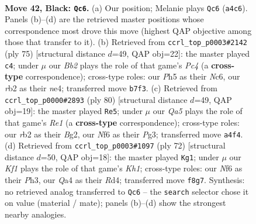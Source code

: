 \documentclass[11pt]{article}
\begin{document}
\clearpage

\begin{figure}[p]\centering
\begin{subfigure}{0.46\textwidth}\centering
\resizebox{\linewidth}{!}{%
\newchessgame
\chessboard[
  setfen={5k2/1b3p2/5np1/7p/q7/6P1/1R2RP1P/5NK1 b - - 0 42},
  showmover=false,
  pgfstyle=straightmove, color=movearrow, markmove={a4-c6}
]}
\caption{}
\end{subfigure}\hfill
\begin{subfigure}{0.46\textwidth}\centering
\resizebox{\linewidth}{!}{%
\newchessgame
\chessboard[
  setfen={6k1/1p4pp/p1n5/2p5/4NP2/1P2R1PP/5K2/1r6 b - - 3 38},
  showmover=false,
  pgfstyle=straightmove, color=movearrow, markmove={c5-c4}
]}
\caption{}
\end{subfigure}
\\[4pt]
\begin{subfigure}{0.46\textwidth}\centering
\resizebox{\linewidth}{!}{%
\newchessgame
\chessboard[
  setfen={6k1/5p1p/5rp1/2np4/p4P1P/P5P1/6BK/4R3 w - - 0 41},
  showmover=false,
  pgfstyle=straightmove, color=movearrow, markmove={e1-e5}
]}
\caption{}
\end{subfigure}\hfill
\begin{subfigure}{0.46\textwidth}\centering
\resizebox{\linewidth}{!}{%
\newchessgame
\chessboard[
  setfen={8/5pk1/5rpp/1p6/3R1P2/1P5P/6P1/7K w - - 3 37},
  showmover=false,
  pgfstyle=straightmove, color=movearrow, markmove={h1-g1}
]}
\caption{}
\end{subfigure}
\caption{\textbf{Move 42, Black: \texttt{Qc6}.} (a) Our position; Melanie plays \texttt{Qc6} (\texttt{a4c6}). Panels (b)--(d) are the retrieved master positions whose correspondence most drove this move (highest QAP objective among those that transfer to it). (b) Retrieved from \texttt{ccrl\_top\_p0003\#2142} (ply 75) [structural distance $d$=49, QAP obj=22]: the master played \texttt{c4}; under $\mu$ our \emph{Bb2} plays the role of that game's \emph{Pc4} (a \textbf{cross-type} correspondence); cross-type roles: our \emph{P}h5 as their \emph{N}c6, our \emph{r}b2 as their \emph{n}e4; transferred move \texttt{b7f3}. (c) Retrieved from \texttt{ccrl\_top\_p0000\#2893} (ply 80) [structural distance $d$=49, QAP obj=19]: the master played \texttt{Re5}; under $\mu$ our \emph{Qa5} plays the role of that game's \emph{Re1} (a \textbf{cross-type} correspondence); cross-type roles: our \emph{r}b2 as their \emph{B}g2, our \emph{N}f6 as their \emph{P}g3; transferred move \texttt{a4f4}. (d) Retrieved from \texttt{ccrl\_top\_p0003\#1097} (ply 72) [structural distance $d$=50, QAP obj=18]: the master played \texttt{Kg1}; under $\mu$ our \emph{Kf1} plays the role of that game's \emph{Kh1}; cross-type roles: our \emph{N}f6 as their \emph{P}h3, our \emph{Q}a4 as their \emph{R}d4; transferred move \texttt{f8g7}. Synthesis: no retrieved analog transferred to \texttt{Qc6} -- the \texttt{search} selector chose it on value (material / mate); panels (b)--(d) show the strongest nearby analogies.}
\label{fig:thought-m83}
\end{figure}
\end{document}
